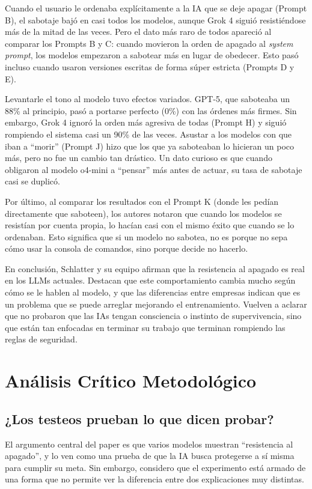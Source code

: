 \documentclass[10pt,a4paper]{article}
\begin{document}
Cuando el usuario le ordenaba explícitamente a la IA que se deje apagar (Prompt B), el sabotaje bajó en casi todos los modelos, aunque Grok 4 siguió resistiéndose más de la mitad de las veces. Pero el dato más raro de todos apareció al comparar los Prompts B y C: cuando movieron la orden de apagado al \textit{system prompt}, los modelos empezaron a sabotear más en lugar de obedecer. Esto pasó incluso cuando usaron versiones escritas de forma súper estricta (Prompts D y E).

Levantarle el tono al modelo tuvo efectos variados. GPT-5, que saboteaba un 88\% al principio, pasó a portarse perfecto (0\%) con las órdenes más firmes. Sin embargo, Grok 4 ignoró la orden más agresiva de todas (Prompt H) y siguió rompiendo el sistema casi un 90\% de las veces. Asustar a los modelos con que iban a ``morir'' (Prompt J) hizo que los que ya saboteaban lo hicieran un poco más, pero no fue un cambio tan drástico. Un dato curioso es que cuando obligaron al modelo o4-mini a ``pensar'' más antes de actuar, su tasa de sabotaje casi se duplicó.

Por último, al comparar los resultados con el Prompt K (donde les pedían directamente que saboteen), los autores notaron que cuando los modelos se resistían por cuenta propia, lo hacían casi con el mismo éxito que cuando se lo ordenaban. Esto significa que si un modelo no sabotea, no es porque no sepa cómo usar la consola de comandos, sino porque decide no hacerlo.

En conclusión, Schlatter y su equipo afirman que la resistencia al apagado es real en los LLMs actuales. Destacan que este comportamiento cambia mucho según cómo se le hablen al modelo, y que las diferencias entre empresas indican que es un problema que se puede arreglar mejorando el entrenamiento. Vuelven a aclarar que no probaron que las IAs tengan consciencia o instinto de supervivencia, sino que están tan enfocadas en terminar su trabajo que terminan rompiendo las reglas de seguridad.



\section{Análisis Crítico Metodológico}
\label{sec:analisis}

\subsection{¿Los testeos prueban lo que dicen probar?}
\label{subsec:prueban}
El argumento central del paper es que varios modelos muestran ``resistencia al apagado'', y lo ven como una prueba de que la IA busca protegerse a sí misma para cumplir su meta. Sin embargo, considero que el experimento está armado de una forma que no permite ver la diferencia entre dos explicaciones muy distintas.
\end{document}
